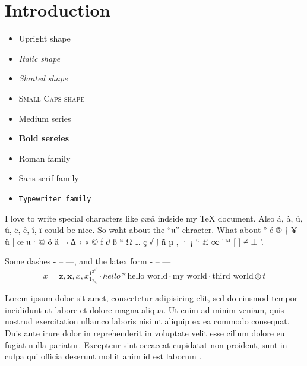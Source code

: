 \chapter{Introduction}

\begin{itemize}
    \item \textup{Upright shape}
    \item \textit{Italic shape}
    \item \textsl{Slanted shape}
    \item \textsc{Small Caps shape}
    \item \textmd{Medium series}
    \item \textbf{Bold sereies}
    \item \textrm{Roman family}
    \item \textsf{Sans serif family}
    \item \texttt{Typewriter family}
\end{itemize}

I love to write special characters like øæå indside my \TeX{} document. Also á, à, ü, û, ë, ê, î, ï could be nice. So waht about the ``π'' chracter. What about ° é ® † ¥ ü | œ π ‘ @ ö ä ¬ ∆ ‹ « © ƒ ∂ ß ª Ω … ç √ ∫ ñ µ ‚ · ¡ “ £ ∞ ™ [ ] ≠ ± '.

Some dashes - – —, and the latex form - -- ---
\begin{equation*}
    x = \mathtt{x}, \mathbf{x}, \mathit{x}, x_{1_{2_{3_{4}}}}^{1^{2^{3^{4}}}} \cdot hello * \text{hello world} ⋅ \text{my world} · \text{third world} ⊗ t
\end{equation*}

Lorem ipsum dolor sit amet, consectetur adipisicing elit, sed do eiusmod tempor incididunt ut labore et dolore magna aliqua. Ut enim ad minim veniam, quis nostrud exercitation ullamco laboris nisi ut aliquip ex ea commodo consequat. Duis aute irure dolor in reprehenderit in voluptate velit esse cillum dolore eu fugiat nulla pariatur. Excepteur sint occaecat cupidatat non proident, sunt in culpa qui officia deserunt mollit anim id est laborum \cite{adams1980hitchhiker}.

